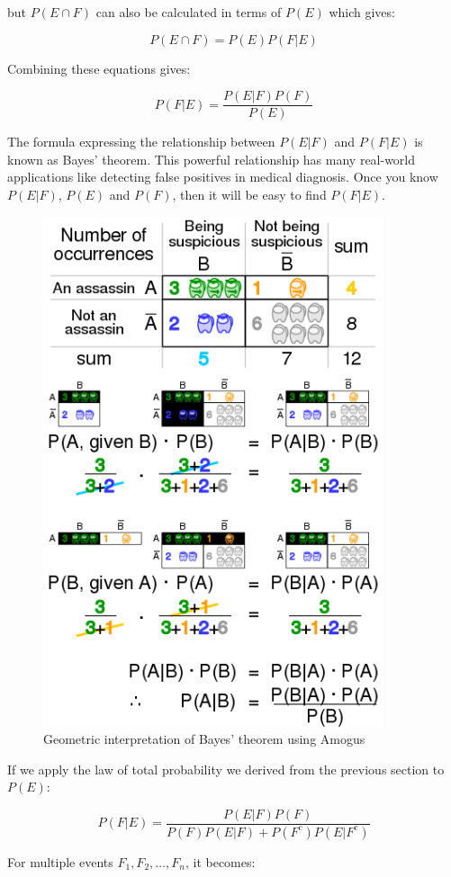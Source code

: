 \documentclass[12pt, a4paper]{article}
\begin{document}
but $P(E \cap F)$ can also be calculated in terms of $P(E)$ which gives:

$$P(E \cap F)=P(E)P(F|E)$$

Combining these equations gives:

$$\boxed{P(F|E)=\frac{P(E|F)P(F)}{P(E)}}$$

The formula expressing the relationship between $P(E|F)$ and $P(F|E)$ is known as Bayes' theorem. This powerful relationship has many real-world applications like detecting false positives in medical diagnosis. Once you know $P(E|F)$, $P(E)$ and $P(F)$, then it will be easy to find $P(F|E)$.

\begin{figure}[H]
\centering
\includegraphics[width=100mm]{3.png}
\caption{Geometric interpretation of Bayes' theorem using Amogus}
\end{figure}

If we apply the law of total probability we derived from the previous section to $P(E)$:

$$P(F|E)=\frac{P(E|F)P(F)}{P(F) P(E|F) + P(F^c) P(E|F^c)}$$

For multiple events $F_1, F_2, \dots, F_n$, it becomes:
\end{document}
